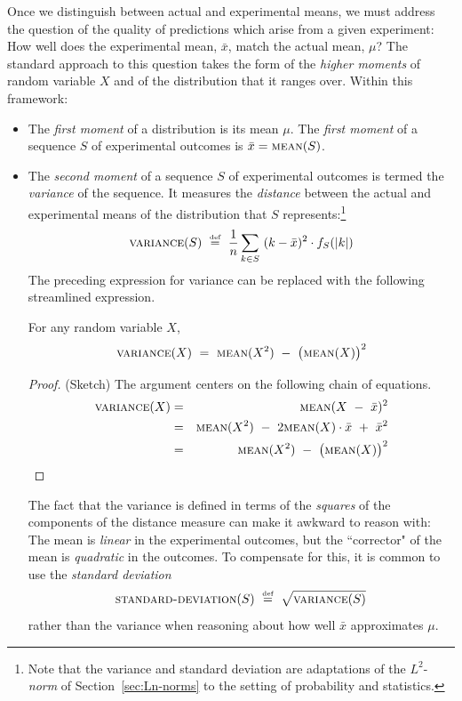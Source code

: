  

\smallskip

Once we distinguish between actual and experimental means, we must address the question of the quality of predictions which arise from a given experiment:  How well does the experimental mean, $\bar{x}$, match the actual mean, $\mu$?  The standard approach to this question takes the form of the {\em higher moments} of random variable $X$ and of the distribution that it ranges over.  Within this framework:
\begin{itemize}
\item
The {\em first moment} of a distribution is its mean $\mu$.  The  {\em first moment} of a sequence $S$ of experimental outcomes is $\bar{x}  =  \mbox{\sc mean}(S)$.
\medskip\item
The {\em second moment} of a sequence $S$ of experimental outcomes is termed the {\it variance} of the sequence.   It measures the {\em distance} between the actual and experimental means of the distribution that $S$ represents:\footnote{Note that the variance and standard deviation are adaptations of the $L^2$-{\it norm} of Section~\ref{sec:Ln-norms} to the setting of probability and statistics.}
\[  \mbox{\sc variance}(S) \ \stackrel{\mbox{{\tiny def}}}{=} \ {1 \over n} \sum_{k \in S} \ (k - \bar{x})^2 \cdot f_S(|k|) \]
The preceding expression for variance can be replaced with the following streamlined expression.

\begin{prop}
\label{thm:variance-formula}
For any random variable $X$,
\[ \mbox{\sc variance}(X) \ = \ \mbox{\sc mean}(X^2) \ - \ \big(\mbox{\sc mean}(X)\big)^2 \]
\end{prop}

\begin{proof}{(Sketch)}
The argument centers on the following chain of equations.
\begin{eqnarray*}
\mbox{\sc variance}(X) & = &
  \mbox{\sc mean}(X \ - \ \bar{x})^2 \\
 & = &
\mbox{\sc mean}(X^2) \ - \ 2 \mbox{\sc mean}(X) \cdot \bar{x} \ + \ \bar{x}^2 \\
 & = &
\mbox{\sc mean}(X^2) \ - \ \big(\mbox{\sc mean}(X)\big)^2
\end{eqnarray*}
\end{proof}

The fact that the variance is defined in terms of the {\em squares} of the components of the distance measure can make it awkward to reason with:  The mean is {\em linear} in the experimental outcomes, but the ``corrector" of the mean is {\em quadratic} in the outcomes.  To compensate for this, it is common to use the {\it standard deviation}
\[ \mbox{\sc standard-deviation}(S) \ \eqdef \ \sqrt{\mbox{\sc variance}(S)} \]
rather than the variance when reasoning about how well $\bar{x}$ approximates $\mu$.


\end{itemize}
